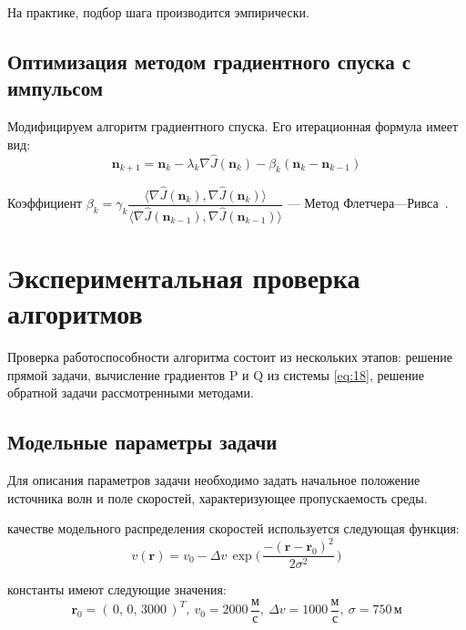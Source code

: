 \documentclass[12pt, cleqn, a4paper]{article}
\newcommand{\bfv}[1]{\mathbf{#1}}
\newcommand{\dprod}[2]{\langle #1, #2 \rangle}
\newcommand{\matr}[1]{\mathrm{#1}}
\begin{document}
На практике, подбор шага производится эмпирически.

\subsection{Оптимизация методом градиентного спуска с импульсом}
Модифицируем алгоритм градиентного спуска. Его итерационная формула имеет вид:
\begin{equation} \label{eq:32}
\bfv{n}_{k+1} = \bfv{n}_k - \lambda_k \nabla \hat{J}(\bfv{n}_k) - \beta_k (\bfv{n}_k - \bfv{n}_{k-1})
\end{equation}

Коэффициент $\beta_k = \gamma_k\dfrac{\dprod{\nabla \hat{J}(\bfv{n}_k)}{\nabla \hat{J}(\bfv{n}_k)}}{\dprod{\nabla \hat{J}(\bfv{n}_{k-1})}{\nabla \hat{J}(\bfv{n}_{k-1})}}$ --- Метод Флетчера---Ривса~\cite{dennis1996numerical, nesterov1984methods}.

\newpage
\section{Экспериментальная проверка алгоритмов}
Проверка работоспособности алгоритма состоит из нескольких этапов: решение прямой задачи, вычисление градиентов $\matr{P}$ и $\matr{Q}$ из системы \eqref{eq:18}, решение обратной задачи рассмотренными методами.

\subsection{Модельные параметры задачи}
Для описания параметров задачи необходимо задать начальное положение источника волн и поле скоростей, характеризующее пропускаемость среды.

 качестве модельного распределения скоростей используется следующая функция:
\begin{equation*}
v(\bfv{r}) = v_0 - \Delta v\,\exp\Biggl(\,\dfrac{-(\bfv{r} - \bfv{r}_0)^2}{2\sigma^2}\,\Biggr)
\end{equation*}

 константы имеют следующие значения:
\begin{equation*}
\bfv{r}_0 = (\,0,\,0,\,3000\,)^T, \ v_0 = 2000\,\dfrac{\text{м}}{\text{с}}, \ \Delta v = 1000\,\dfrac{\text{м}}{\text{с}}, \ \sigma = 750\,\text{м}
\end{equation*}
\end{document}
